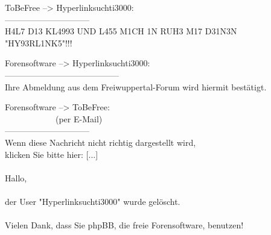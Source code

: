 \noindent \parbox{\textwidth}{

    \begin{footnotesize}
    \begin{itshape}
    \begin{flushright}

\noindent ToBeFree --> Hyperlinksuchti3000:\\
\noindent ------------------------------\\
\noindent H4L7 D13 KL4993 UND L455 M1CH 1N RUH3 M17 D31N3N\\
\noindent "HY93RL1NK5"!!!\\

    \end{flushright}
    \end{itshape}
    \end{footnotesize}

}

\noindent \parbox{\textwidth}{

    \begin{footnotesize}
    \begin{itshape}
    \begin{flushright}

\noindent Forensoftware --> Hyperlinksuchti3000:\\
\noindent -----------------------------------------\\
\noindent Ihre Abmeldung aus dem Freiwuppertal-Forum wird hiermit bestätigt.\\

    \end{flushright}
    \end{itshape}
    \end{footnotesize}

}

\noindent \parbox{\textwidth}{

    \begin{footnotesize}
    \begin{itshape}
    \begin{flushright}

\noindent Forensoftware --> ToBeFree:\\
\noindent ~~~~~~~~~~~~(per E-Mail)\\
\noindent ------------------------------\\
\noindent Wenn diese Nachricht nicht richtig dargestellt wird,\\
\noindent klicken Sie bitte hier: [...]\\
\noindent \\
\noindent Hallo,\\
\noindent \\
\noindent der User "Hyperlinksuchti3000" wurde gelöscht.\\
\noindent \\
\noindent Vielen Dank, dass Sie phpBB, die freie Forensoftware, benutzen!\\

    \end{flushright}
    \end{itshape}
    \end{footnotesize}

}

